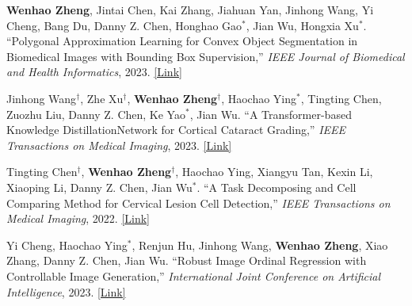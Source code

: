 \begin{cventries}
{\begin{cvitemize2}
            \item \textbf{Wenhao Zheng}, Jintai Chen, Kai Zhang, Jiahuan Yan, Jinhong Wang, Yi Cheng, Bang Du, Danny Z. Chen, Honghao Gao$^*$, Jian Wu, Hongxia Xu$^*$. ``Polygonal Approximation Learning for Convex Object Segmentation in Biomedical Images with Bounding Box Supervision,'' \textit{IEEE Journal of Biomedical and Health Informatics}, 2023. \href{https://ieeexplore.ieee.org/document/10354298}{\textcolor{link}{[Link]}}
            \vspace{1mm}
            \item Jinhong Wang$^\dagger$, Zhe Xu$^\dagger$, \textbf{Wenhao Zheng$^\dagger$}, Haochao Ying$^*$, Tingting Chen, Zuozhu Liu, Danny Z. Chen, Ke Yao$^*$, Jian Wu. ``A Transformer-based Knowledge DistillationNetwork for Cortical Cataract Grading,'' \textit{IEEE Transactions on Medical Imaging}, 2023. \href{https://ieeexplore.ieee.org/abstract/document/10294274}{\textcolor{link}{[Link]}}
            \vspace{1mm}
            \item Tingting Chen$^\dagger$, \textbf{Wenhao Zheng$^\dagger$}, Haochao Ying, Xiangyu Tan, Kexin Li, Xiaoping Li, Danny Z. Chen, Jian Wu$^*$. ``A Task Decomposing and Cell Comparing Method for Cervical Lesion Cell Detection,'' \textit{IEEE Transactions on Medical Imaging}, 2022. \href{https://ieeexplore.ieee.org/document/9744114}{\textcolor{link}{[Link]}}
            \vspace{1mm}
            \item Yi Cheng, Haochao Ying$^*$, Renjun Hu, Jinhong Wang, \textbf{Wenhao Zheng}, Xiao Zhang, Danny Z. Chen, Jian Wu. ``Robust Image Ordinal Regression with Controllable Image Generation,'' \textit{International Joint Conference on Artificial Intelligence}, 2023. \href{https://arxiv.org/abs/2305.04213}{\textcolor{link}{[Link]}}

\end{cvitemize2}}
\end{cventries}
